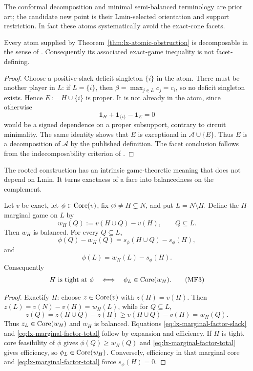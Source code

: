 The conformal decomposition and minimal semi-balanced terminology are prior
art; the candidate new point is their Lmin-selected orientation and support
restriction.  In fact these atoms systematically avoid the exact-cone
facets.

\begin{corollary}
\label{cor:lx-atomic-facet-avoidance}
Every atom supplied by Theorem~\ref{thm:lx-atomic-obstruction} is decomposable
in the sense of \citet{StudenyKratochvil2022}.  Consequently its associated
exact-game inequality is not facet-defining.
\end{corollary}

\begin{proof}
Choose a positive-slack deficit singleton $\{i\}$ in the atom.  There must be
another player in $L$: if $L=\{i\}$, then
$\beta=\max_{j\in L}c_j=c_i$, so no deficit singleton exists.  Hence
$E:=H\cup\{i\}$ is proper.  It is not already in the atom, since otherwise
\[
 \mathbf1_H+\mathbf1_{\{i\}}-\mathbf1_E=0
\]
would be a signed dependence on a proper subsupport, contrary to circuit
minimality.  The same identity shows that $E$ is exceptional in
$\mathcal A\cup\{E\}$.  Thus $E$ is a decomposition of $\mathcal A$ by the
published definition.  The facet conclusion follows from the
indecomposability criterion of \citet{StudenyKratochvil2022}.
\end{proof}

The rooted construction has an intrinsic game-theoretic meaning that does
not depend on Lmin.  It turns exactness of a face into balancedness on the
complement.

\begin{theorem}
\label{thm:lx-marginal-core-factorization}
Let $v$ be exact, let $\phi\in\operatorname{Core}(v)$, fix
$\varnothing\ne H\subsetneq N$, and put $L=N\setminus H$.  Define the
$H$-marginal game on $L$ by
\[
 w_H(Q):=v(H\cup Q)-v(H),\qquad Q\subseteq L.
\]
Then $w_H$ is balanced.  For every $Q\subseteq L$,
\[
 \phi(Q)-w_H(Q)=s_\phi(H\cup Q)-s_\phi(H),          \tag{MF1}
 \label{eq:lx-marginal-factor-slack}
\]
and
\[
 \phi(L)=w_H(L)-s_\phi(H).                         \tag{MF2}
 \label{eq:lx-marginal-factor-total}
\]
Consequently
\[
 H\text{ is tight at }\phi
 \quad\Longleftrightarrow\quad
 \phi_L\in\operatorname{Core}(w_H).                              \tag{MF3}
 \label{eq:lx-marginal-core-equivalence}
\]
\end{theorem}

\begin{proof}
Exactify $H$: choose $z\in\operatorname{Core}(v)$ with $z(H)=v(H)$.  Then
$z(L)=v(N)-v(H)=w_H(L)$, while for $Q\subseteq L$,
\[
 z(Q)=z(H\cup Q)-z(H)\geq v(H\cup Q)-v(H)=w_H(Q).
\]
Thus $z_L\in\operatorname{Core}(w_H)$ and $w_H$ is balanced.
Equations \eqref{eq:lx-marginal-factor-slack} and
\eqref{eq:lx-marginal-factor-total} follow by expansion and efficiency.  If
$H$ is tight, core feasibility of $\phi$ gives
$\phi(Q)\geq w_H(Q)$ and \eqref{eq:lx-marginal-factor-total} gives efficiency,
so $\phi_L\in\operatorname{Core}(w_H)$.  Conversely, efficiency in that marginal core and
\eqref{eq:lx-marginal-factor-total} force $s_\phi(H)=0$.
\end{proof}

